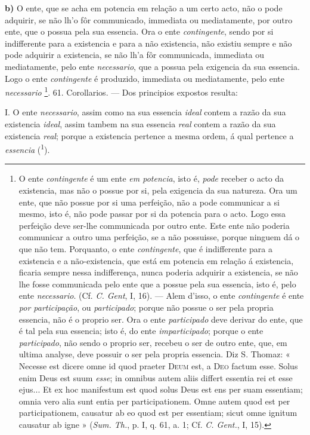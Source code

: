 \textbf{b)} O ente, que se acha em potencia em relação a um certo acto, não o pode adquirir, se não lh'o fôr communicado, immediata ou mediatamente, por outro ente, que o possua pela sua essencia. Ora o ente \emph{contingente}, sendo por si indifferente para a existencia e para a não existencia, não existiu sempre e não pode adquirir a existencia, se não lh'a fôr communicada, immediata ou mediatamente, pelo ente \emph{necessario}, que a possua pela exigencia da sua essencia. Logo o ente \emph{contingente} é produzido, immediata ou mediatamente, pelo ente \emph{necessario} \footnote{O ente \emph{contingente} é um ente \emph{em potencia}, isto é, \emph{pode} receber o acto da existencia, mas não o possue por si, pela exigencia da sua natureza. Ora um ente, que não possue por si uma perfeição, não a pode communicar a si mesmo, isto é, não pode passar por si da potencia para o acto. Logo essa perfeição deve ser-lhe communicada por outro ente. Este ente não poderia communicar a outro uma perfeição, se a não possuisse, porque ninguem dá o que não tem. Porquanto, o ente \emph{contingente}, que é indifferente para a existencia e a não-existencia, que está em potencia em relação á existencia, ficaria sempre nessa indifferença, nunca poderia adquirir a existencia, se não lhe fosse communicada pelo ente que a possue pela sua essencia, isto é, pelo ente \emph{necessario}. (Cf. \emph{C. Gent}, I, 16). --- Alem d'isso, o ente \emph{contingente} é ente \emph{por participação}, ou \emph{participado}; porque não possue o ser pela propria essencia, não é o proprio ser. Ora o ente \emph{participado} deve derivar do ente, que é tal pela sua essencia; isto é, do ente \emph{imparticipado}; porque o ente \emph{participado}, não sendo o proprio ser, recebeu o ser de outro ente, que, em ultima analyse, deve possuir o ser pela propria essencia. Diz S. Thomaz: « Necesse est dicere omne id quod praeter \textsc{Deum} est, a \textsc{Deo} factum esse. Solus enim Deus est suum \emph{esse}; in omnibus autem aliis differt essentia rei et esse ejus... Et ex hoc manifestum est quod solus Deus est ens per suam essentiam; omnia vero alia sunt entia per participationem. Omne autem quod est per participationem, causatur ab eo quod est per essentiam; sicut omne ignitum causatur ab igne » (\emph{Sum. Th.}, p. I, q. 61, a. 1; Cf. \emph{C. Gent.}, I, 15).}.
 61. Corollarios. --- Dos principios expostos resulta:

I. O ente \emph{necessario}, assim como na sua essencia \emph{ideal} contem a razão da sua existencia \emph{ideal}, assim tambem na sua essencia \emph{real} contem a razão da sua existencia \emph{real}; porque a existencia pertence a mesma ordem, á qual pertence a \emph{essencia} (\textsuperscript{1}).

